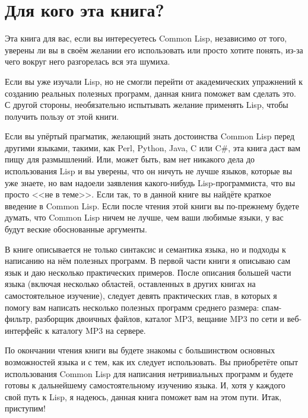 \section{Для кого эта книга?}

Эта книга для вас, если вы интересуетесь Common Lisp, независимо от
того, уверены ли вы в своём желании его использовать или просто хотите понять,
из-за чего вокруг него разгорелась вся эта шумиха.

Если вы уже изучали Lisp, но не смогли перейти от академических упражнений к созданию
реальных полезных программ, данная книга поможет вам сделать это. С другой
стороны, необязательно испытывать желание применять Lisp, чтобы получить пользу от этой
книги.

Если вы упёртый прагматик, желающий знать достоинства Common Lisp перед другими языками,
такими, как Perl, Python, Java, C или C\#, эта книга даст вам пищу для размышлений.
Или, может быть, вам нет никакого дела до использования Lisp и вы уверены, что он
ничуть не лучше языков, которые вы уже знаете, но вам надоели заявления какого-нибудь
Lisp-программиста, что вы просто <<не в теме>>. Если так, то в данной книге вы
найдёте краткое введение в Common Lisp. Если после чтения этой книги вы по-прежнему будете
думать, что Common Lisp ничем не лучше, чем ваши любимые языки, у вас будут веские
обоснованные аргументы.

В книге описывается не только синтаксис и семантика языка, но и подходы к написанию на
нём полезных программ. В первой части книги я описываю сам язык и даю несколько
практических примеров. После описания большей части языка (включая несколько областей,
оставленных в других книгах на самостоятельное изучение), следует девять практических глав,
в которых я помогу вам написать несколько полезных программ среднего размера: спам-фильтр,
разборщик двоичных файлов, каталог MP3, вещание MP3 по сети и веб-интерфейс к каталогу MP3 на
сервере.

По окончании чтения книги вы будете знакомы с большинством основных возможностей языка
и с тем, как их следует использовать. Вы приобретёте опыт использования Common Lisp для
написания нетривиальных программ и будете готовы к дальнейшему самостоятельному изучению
языка. И, хотя у каждого свой путь к Lisp, я надеюсь, данная книга поможет вам на этом
пути. Итак, приступим!

